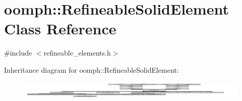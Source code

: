 \hypertarget{classoomph_1_1RefineableSolidElement}{}\section{oomph\+:\+:Refineable\+Solid\+Element Class Reference}
\label{classoomph_1_1RefineableSolidElement}


{\ttfamily \#include $<$refineable\+\_\+elements.\+h$>$}

Inheritance diagram for oomph\+:\+:Refineable\+Solid\+Element\+:\begin{figure}[H]
\begin{center}
\leavevmode
\includegraphics[height=0.865916cm]{classoomph_1_1RefineableSolidElement}
\end{center}
\end{figure}
